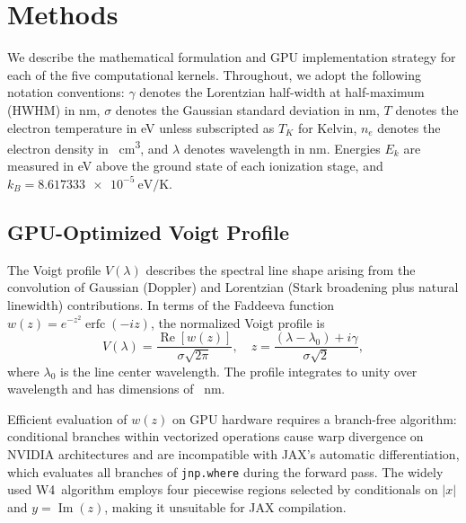 \section{Methods}
\label{sec:methods}

We describe the mathematical formulation and GPU implementation strategy for each of the five computational kernels.
Throughout, we adopt the following notation conventions: $\gamma$ denotes the Lorentzian half-width at half-maximum (HWHM) in \si{\nano\metre}, $\sigma$ denotes the Gaussian standard deviation in \si{\nano\metre}, $T$ denotes the electron temperature in \si{\electronvolt} unless subscripted as $T_K$ for Kelvin, $n_e$ denotes the electron density in \si{\per\cubic\centi\metre}, and $\lambda$ denotes wavelength in \si{\nano\metre}.
Energies $E_k$ are measured in \si{\electronvolt} above the ground state of each ionization stage, and $k_B = \SI{8.617333e-5}{\electronvolt\per\kelvin}$.

\subsection{GPU-Optimized Voigt Profile}
\label{sec:voigt}

The Voigt profile $V(\lambda)$ describes the spectral line shape arising from the convolution of Gaussian (Doppler) and Lorentzian (Stark broadening plus natural linewidth) contributions.
In terms of the Faddeeva function $w(z) = e^{-z^2} \operatorname{erfc}(-iz)$, the normalized Voigt profile is
\begin{equation}
  V(\lambda) = \frac{\operatorname{Re}[w(z)]}{\sigma \sqrt{2\pi}}, \quad
  z = \frac{(\lambda - \lambda_0) + i\gamma}{\sigma\sqrt{2}},
  \label{eq:voigt}
\end{equation}
where $\lambda_0$ is the line center wavelength.
The profile integrates to unity over wavelength and has dimensions of \si{\per\nano\metre}.

Efficient evaluation of $w(z)$ on GPU hardware requires a branch-free algorithm: conditional branches within vectorized operations cause warp divergence on NVIDIA architectures and are incompatible with JAX's automatic differentiation, which evaluates all branches of \texttt{jnp.where} during the forward pass.
The widely used \citet{Humlicek1982} W4~algorithm employs four piecewise regions selected by conditionals on $|x|$ and $y = \operatorname{Im}(z)$, making it unsuitable for JAX compilation.

